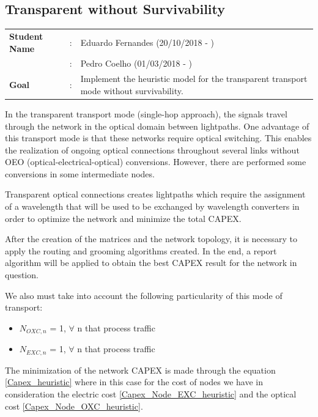 \clearpage

\subsection{Transparent without Survivability}\label{heuristic_Transp_Survivability}
\begin{tcolorbox}	
\begin{tabular}{p{2.75cm} p{0.2cm} p{10.5cm}} 	
\textbf{Student Name}  	&:& Eduardo Fernandes    (20/10/2018 - )\\
	&:& Pedro Coelho    (01/03/2018 - )\\
\textbf{Goal}          &:& Implement the heuristic model for the transparent transport mode without survivability.
\end{tabular}
\end{tcolorbox}


\vspace{11pt}
In the transparent transport mode (single-hop approach), the signals travel through the network in the optical domain between lightpaths. One advantage of this transport mode is that these networks require optical switching. This enables the realization of ongoing optical connections throughout several links without OEO (optical-electrical-optical) conversions. However, there are performed some conversions in some intermediate nodes.

Transparent optical connections creates lightpaths which require the assignment of a wavelength that will be used to be exchanged by wavelength converters in order to optimize the network and minimize the total CAPEX.

After the creation of the matrices and the network topology, it is necessary to apply the routing and grooming algorithms created. In the end, a report algorithm will be applied to obtain the best CAPEX result for the network in question.

We also must take into account the following particularity of this mode of transport:
\begin{itemize}
  \item $N_{OXC,n}$ = 1, \quad $\forall$ n that process traffic
  \item $N_{EXC,n}$ = 1, \quad $\forall$ n that process traffic
\end{itemize}

The minimization of the network CAPEX is made through the equation \ref{Capex_heuristic} where in this case for the cost of nodes we have in consideration the electric cost \ref{Capex_Node_EXC_heuristic} and the optical cost \ref{Capex_Node_OXC_heuristic}.\\

